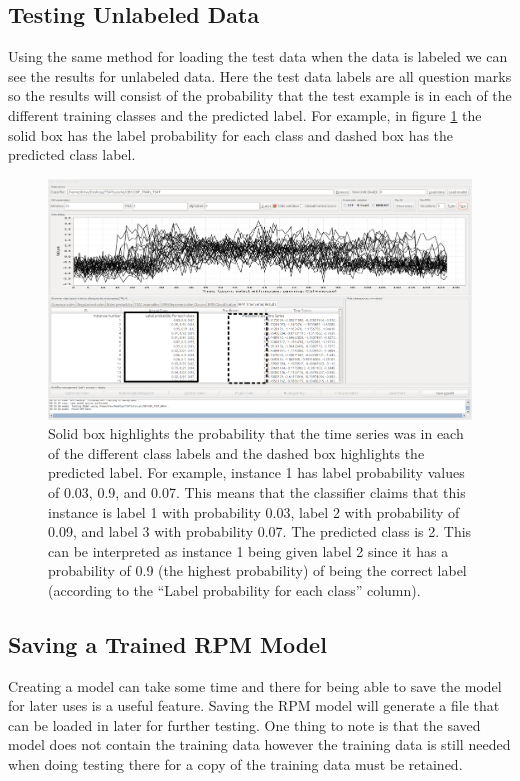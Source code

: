 \documentclass[titlepage, letterpaper, 12pt]{article}
\begin{document}
\subsection{Testing Unlabeled Data}
Using the same method for loading the test data when the data is labeled we can see the results for unlabeled data.  Here the test data labels are all question marks so the results will consist of the probability that the test example is in each of the different training classes and the predicted label.  For example, in figure \ref{fig:TSAT-Results-Unknown-Test} the solid box has the label probability for each class and dashed box has the predicted class label.
\begin{figure}[H]
	\includegraphics[width=\textwidth]{RPMTimeSeriesResultsUnknown}
	\caption{Solid box highlights the probability that the time series was in each of the different class labels and the dashed box highlights the predicted label.  For example, instance 1 has label probability values of 0.03, 0.9, and 0.07.  This means that the classifier claims that this instance is label 1 with probability 0.03, label 2 with probability of 0.09, and label 3 with probability 0.07. The predicted class is 2.  This can be interpreted as instance 1 being given label 2 since it has a probability of 0.9 (the highest probability) of being the correct label (according to the ``Label probability for each class'' column).  }
	\label{fig:TSAT-Results-Unknown-Test}
\end{figure}

\subsection{Saving a Trained RPM Model}
\label{RPMSaving}
Creating a model can take some time and there for being able to save the model for later uses is a useful feature. Saving the RPM model will generate a file that can be loaded in later for further testing. One thing to note is that the saved model does not contain the training data however the training data is still needed when doing testing there for a copy of the training data must be retained.
\end{document}
